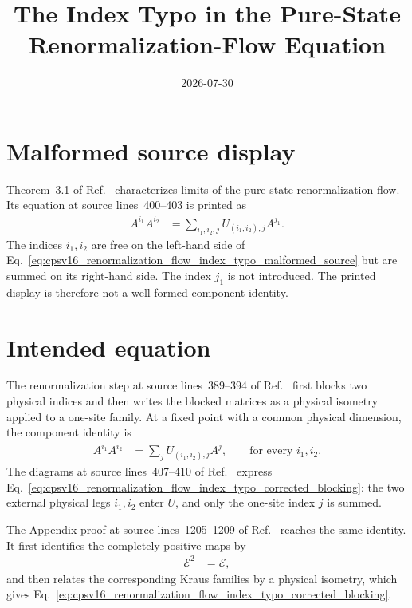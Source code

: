 \documentclass{article}
\title{The Index Typo in the Pure-State Renormalization-Flow Equation}
\author{}
\date{2026-07-30}
\begin{document}
\maketitle
{}

\section{Malformed source display}

Theorem~3.1 of Ref.~\cite{Cirac2016MPDO_arXiv} characterizes limits of the
pure-state renormalization flow. Its equation at source lines~400--403 is
printed as
\begin{align}
    A^{i_1}A^{i_2}
        &=
        \sum_{i_1,i_2,j}
        U_{(i_1,i_2),j}A^{j_1}.
    \label{eq:cpsv16_renormalization_flow_index_typo_malformed_source}
\end{align}
The indices $i_1,i_2$ are free on the left-hand side of
Eq.~\ref{eq:cpsv16_renormalization_flow_index_typo_malformed_source} but are
summed on its right-hand side. The index $j_1$ is not introduced. The printed
display is therefore not a well-formed component identity.

\section{Intended equation}

The renormalization step at source lines~389--394 of
Ref.~\cite{Cirac2016MPDO_arXiv} first blocks two physical indices and then
writes the blocked matrices as a physical isometry applied to a one-site
family. At a fixed point with a common physical dimension, the component
identity is
\begin{align}
    A^{i_1}A^{i_2}
        &=
        \sum_j U_{(i_1,i_2),j}A^j,
        \qquad\text{for every }i_1,i_2.
    \label{eq:cpsv16_renormalization_flow_index_typo_corrected_blocking}
\end{align}
The diagrams at source lines~407--410 of
Ref.~\cite{Cirac2016MPDO_arXiv} express
Eq.~\ref{eq:cpsv16_renormalization_flow_index_typo_corrected_blocking}: the two
external physical legs $i_1,i_2$ enter $U$, and only the one-site index $j$ is
summed.

The Appendix proof at source lines~1205--1209 of
Ref.~\cite{Cirac2016MPDO_arXiv} reaches the same identity. It first identifies
the completely positive maps by
\begin{align}
    \mathcal E^2 &= \mathcal E,
    \label{eq:cpsv16_renormalization_flow_index_typo_cp_idempotence}
\end{align}
and then relates the corresponding Kraus families by a physical isometry,
which gives
Eq.~\ref{eq:cpsv16_renormalization_flow_index_typo_corrected_blocking}.
\end{document}
